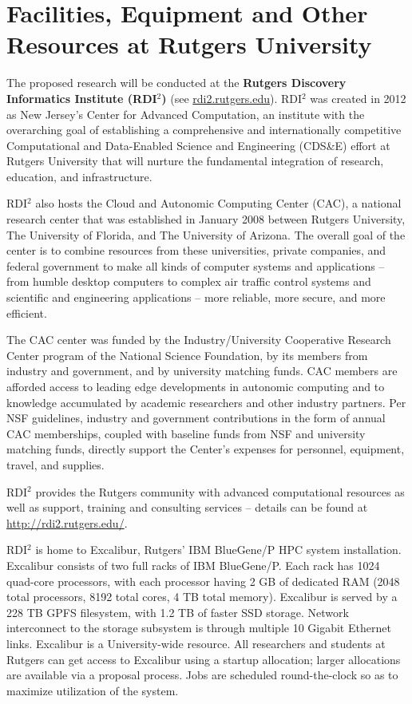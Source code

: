 
\section*{Facilities, Equipment and Other Resources at Rutgers University}

\noindent The proposed research will be conducted at the {\bf Rutgers Discovery Informatics Institute  (RDI$^2$)} (see \url{rdi2.rutgers.edu}). RDI$^2$ was created in 2012 as New Jersey's Center for Advanced Computation, an institute with the overarching goal of establishing a comprehensive and internationally competitive Computational and Data-Enabled Science and Engineering (CDS\&E) effort at Rutgers University that will nurture the fundamental integration of research, education, and infrastructure. 

RDI$^2$ also hosts the Cloud and Autonomic Computing Center (CAC), a national research center that was established in January 2008 between Rutgers University, The University of Florida, and The University of Arizona.  The overall goal of the center is to combine resources from these universities, private companies, and federal government to make all kinds of computer systems and applications -- from humble desktop computers to complex air traffic control systems and scientific and engineering applications -- more reliable, more secure, and more efficient. 

The CAC center was funded by the Industry/University Cooperative Research Center program of the National Science Foundation, by its members from industry and government, and by university matching funds. CAC members are afforded access to leading edge developments in autonomic computing and to knowledge accumulated by academic researchers and other industry partners. Per NSF guidelines, industry and government contributions in the form of annual CAC memberships, coupled with baseline funds from NSF and university matching funds, directly support the Center's expenses for personnel, equipment, travel, and supplies. 

RDI$^2$ provides the Rutgers community with advanced computational resources as well as support, training and consulting services -- details can be found at \url{http://rdi2.rutgers.edu/}.

RDI$^2$ is home to Excalibur, Rutgers' IBM BlueGene/P HPC system installation.  Excalibur consists of two full racks of IBM BlueGene/P.  Each rack has 1024 quad-core processors, with each processor having 2 GB of dedicated RAM (2048 total processors, 8192 total cores, 4 TB total memory).  Excalibur is served by a 228 TB GPFS filesystem, with 1.2 TB of faster SSD storage.  Network interconnect to the storage subsystem is through multiple 10 Gigabit Ethernet links.  Excalibur is a University-wide resource.  All researchers and students at Rutgers can get access to Excalibur using a startup allocation; larger allocations are available via a proposal process. Jobs are scheduled round-the-clock so as to maximize utilization of the system.  


